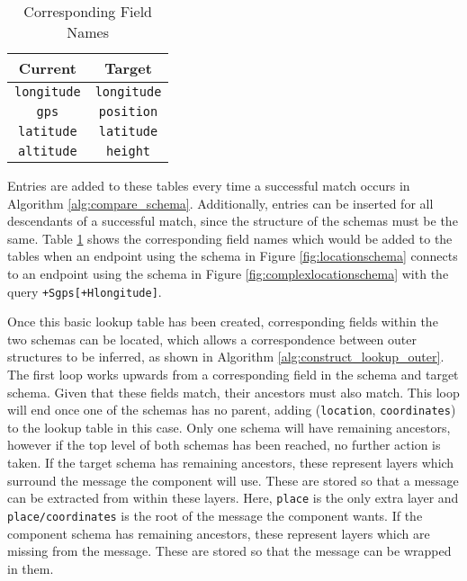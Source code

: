 \documentclass[12pt,twoside,notitlepage]{report}
\begin{document}
\begin{table}[b]
\centering

\begin{tabular}{c c}
\hline\hline
Current & Target \\
\hline
{\tt longitude} & {\tt longitude} \\
{\tt gps} & {\tt position} \\
{\tt latitude} & {\tt latitude} \\
{\tt altitude} & {\tt height} \\

\hline
\end{tabular}

\caption{Corresponding Field Names}
\label{tab:lookup_table}
\end{table}
 
Entries are added to these tables every time a successful match occurs in Algorithm \ref{alg:compare_schema}. 
Additionally, entries can be inserted for all descendants of a successful match, since the structure of the schemas must be the same. 
Table \ref{tab:lookup_table} shows the corresponding field names which would be added to the tables when an endpoint using the schema in Figure \ref{fig:locationschema} connects to an endpoint using the schema in Figure \ref{fig:complexlocationschema} with the query {\tt +Sgps[+Hlongitude]}.

Once this basic lookup table has been created, corresponding fields within the two schemas can be located, which allows a correspondence between outer structures to be inferred, as shown in Algorithm \ref{alg:construct_lookup_outer}. 
The first loop works upwards from a corresponding field in the schema and target schema. 
Given that these fields match, their ancestors must also match. 
This loop will end once one of the schemas has no parent, adding ({\tt location}, {\tt coordinates}) to the lookup table in this case. 
Only one schema will have remaining ancestors, however if the top level of both schemas has been reached, no further action is taken. 
If the target schema has remaining ancestors, these represent layers which surround the message the component will use. 
These are stored so that a message can be extracted from within these layers. 
Here, {\tt place} is the only extra layer and {\tt place/coordinates} is the root of the message the component wants. 
If the component schema has remaining ancestors, these represent layers which are missing from the message. 
These are stored so that the message can be wrapped in them. 
\end{document}
